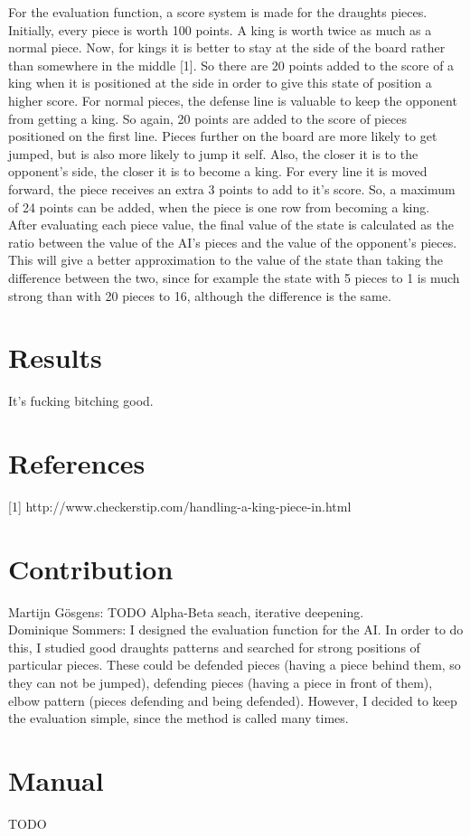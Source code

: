 \documentclass[a4paper,twoside,11pt]{article}
\begin{document}
For the evaluation function, a score system is made for the draughts pieces. Initially, every piece is worth 100 points. A king is worth twice as much as a normal piece. Now, for kings it is better to stay at the side of the board rather than somewhere in the middle [1]. So there are 20 points added to the score of a king when it is positioned at the side in order to give this state of position a higher score.
For normal pieces, the defense line is valuable to keep the opponent from getting a king. So again, 20 points are added to the score of pieces positioned on the first line. Pieces further on the board are more likely to get jumped, but is also more likely to jump it self. Also, the closer it is to the opponent's side, the closer it is to become a king. For every line it is moved forward, the piece receives an extra 3 points to add to it's score. So, a maximum of 24 points can be added, when the piece is one row from becoming a king.\\
After evaluating each piece value, the final value of the state is calculated as the ratio between the value of the AI's pieces and the value of the opponent's pieces. This will give a better approximation to the value of the state than taking the difference between the two, since for example the state with 5 pieces to 1 is much strong than with 20 pieces to 16, although the difference is the same. 

\section{Results}
It's fucking bitching good.

\section{References}
[1] http://www.checkerstip.com/handling-a-king-piece-in.html

\section{Contribution}
Martijn Gösgens: TODO Alpha-Beta seach, iterative deepening. \\
Dominique Sommers: I designed the evaluation function for the AI. In order to do this, I studied good draughts patterns and searched for strong positions of particular pieces. These could be defended pieces (having a piece behind them, so they can not be jumped), defending pieces (having a piece in front of them), elbow pattern (pieces defending and being defended). However, I decided to keep the evaluation simple, since the method is called many times.

\section{Manual}
TODO
\end{document}
